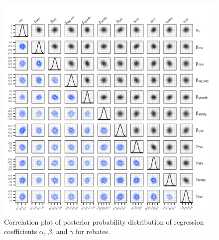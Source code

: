 \documentclass[draft]{agujournal}\usepackage{knitr}
\begin{document}
\begin{figure}
\includegraphics[width=6.25in]{figures_si/reb_pairs_plot-1} \caption[Correlation plot of posterior probability distribution of regression coefficients $\alpha$, $\beta$, and $\gamma$ for rebates]{Correlation plot of posterior probability distribution of regression coefficients $\alpha$, $\beta$, and $\gamma$ for rebates.}\label{fig:reb_pairs_plot}
\end{figure}





\end{document}
